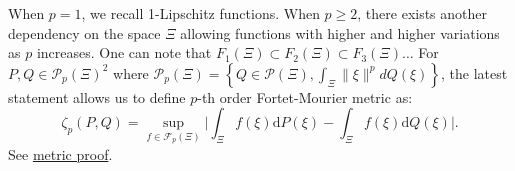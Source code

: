 \documentclass{amsart}
\begin{document}
When $p=1$, we recall 1-Lipschitz functions. When $p\geq 2$, there exists another dependency on the space $\Xi$ allowing functions with higher and higher variations as $p$ increases. One can note that $F_1\left(\Xi\right)\subset F_2\left(\Xi\right)\subset F_3\left(\Xi\right) \hdots$ For $P,Q\in\mathcal{P}_p\left(\Xi\right)^2$ where $\mathcal{P}_p\left(\Xi\right)=\left\{Q\in\mathcal{P}\left(\Xi\right), \int_\Xi \lVert\xi\rVert^pdQ\left(\xi\right)\right\}$, the latest statement allows us to define $p$-th order Fortet-Mourier metric as:
$$
\zeta_p\left(P,Q\right)=\sup_{f\in\mathcal{F}_p\left(\Xi\right)}\lvert \int_\Xi f\left(\xi\right)\text{d}P\left(\xi\right)-\int_\Xi f\left(\xi\right)\text{d}Q\left(\xi\right)\rvert.
$$
See \href{https://www.imo.universite-paris-saclay.fr/~pierre-loic.meliot/master/exam-2017.pdf}{metric proof}.
\end{document}
